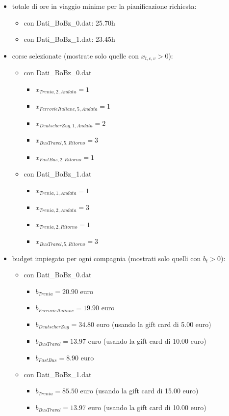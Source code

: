 \documentclass[main.tex]{subfiles}
\begin{document}
\begin{itemize}
    \item totale di ore in viaggio minime per la pianificazione richiesta:
    \begin{itemize}
        \item con Dati\_BoBz\_0.dat: 25.70h
        \item con Dati\_BoBz\_1.dat: 23.45h
    \end{itemize}
    \item corse selezionate (mostrate solo quelle con $x_{t,c,v} > 0$):
    \begin{itemize}
        \item con Dati\_BoBz\_0.dat
        \begin{itemize}
            \item $x_{Trenia,2,Andata} = 1$
            \item $x_{FerrovieItaliane,5,Andata} = 1$
            \item $x_{DeutscherZug,1,Andata} = 2$
            \item $x_{BusTravel,5,Ritorno} = 3$
            \item $x_{FastBus,2,Ritorno} = 1$
        \end{itemize}
        \item con Dati\_BoBz\_1.dat
        \begin{itemize}
            \item $x_{Trenia,1,Andata} = 1$
            \item $x_{Trenia,2,Andata} = 3$
            \item $x_{Trenia,2,Ritorno} = 1$
            \item $x_{BusTravel,5,Ritorno} = 3$
        \end{itemize}
    \end{itemize}
    \item budget impiegato per ogni compagnia (mostrati solo quelli con $b_t > 0$):
    \begin{itemize}
        \item con Dati\_BoBz\_0.dat
        \begin{itemize}
            \item $b_{Trenia} = 20.90$ euro
            \item $b_{FerrovieItaliane} = 19.90$ euro
            \item $b_{DeutscherZug} = 34.80$ euro (usando la gift card di 5.00 euro)
            \item $b_{BusTravel} = 13.97$ euro (usando la gift card di 10.00 euro)
            \item $b_{FastBus} = 8.90$ euro
        \end{itemize}
        \item con Dati\_BoBz\_1.dat
        \begin{itemize}
            \item $b_{Trenia} = 85.50$ euro (usando la gift card di 15.00 euro)
            \item $b_{BusTravel} = 13.97$ euro (usando la gift card di 10.00 euro)
        \end{itemize}
    \end{itemize}
\end{itemize}
\end{document}
